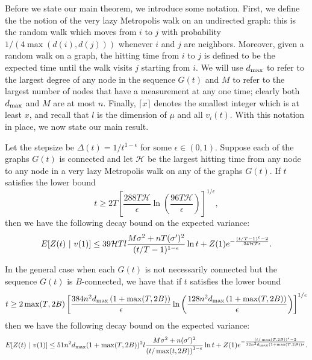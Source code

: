 \documentclass[final]{siamltex}
\begin{document}
Before we state our main theorem, we introduce some notation. First, we define the the notion of the very lazy Metropolis walk on an undirected graph: this is the random walk which moves from $i$ to $j$ with probability 
$1/(4\max(d(i),d(j)))$ whenever $i$ and $j$ are neighbors. Moreover, given a random walk on a graph, the hitting time from $i$ to $j$ is defined to be the expected time until
the walk visits $j$ starting from $i$. We will use $d_{\rm max}$ to refer to the largest degree of any node in the sequence $G(t)$ and $M$ to refer to the
largest number of nodes that have a measurement at any one time; clearly both $d_{\rm max}$ and $M$ are at most $n$. Finally,  $\lceil x \rceil$ denotes the smallest integer which is at least $x$, and recall that $l$ is the dimension of $\mu$ and all $v_i(t)$. With this notation in place, we now state our main result. 

\bigskip

\begin{theorem} \label{mainthm} Let the stepsize be $\Delta(t)=1/t^{1-\epsilon}$ for some $\epsilon \in (0,1)$. Suppose each of the graphs  $G(t)$ is connected and let $\mathcal{H}$ be the largest hitting time from any node to any node in a very lazy
Metropolis walk on any of the graphs $G(t)$. If $t$ satisfies the lower bound
\begin{equation} \label{transient} t \geq 2T \left[ \frac{288T  \mathcal{H} }{\epsilon} \ln \left( \frac{96T   \mathcal{H} }{\epsilon}  \right) \right]^{1/\epsilon}, \end{equation}
 then we have the following decay bound on the expected variance: 
\begin{equation} \label{eq:connected} 
 E[ Z(t) ~|~ v(1) ]  \leq   39 {\cal H} T l \frac{M \sigma^2 + n T(\sigma')^2}{(t/T-1)^{1 -  \epsilon}} \ln t + Z(1) e^{-\frac{(t/T-1)^\epsilon - 2}{24 \mathcal{H} T\epsilon}}.  \end{equation}

In the general case when each $G(t)$ is not necessarily connected but the sequence $G(t)$ is $B$-connected, we have that if $t$ satisfies the lower bound
\[ t \geq 2 \max(T,2B) \left[ \frac{384 n^2 d_{\rm max} \left( 1 + \max(T,2B) \right) }{\epsilon} \ln \left( \frac{128 n^2 d_{\rm max} \left( 1 + \max(T,2B) \right) }{\epsilon} \right) \right]^{1/\epsilon} \] then 
we have the following decay bound on the expected variance: \begin{equation} \label{eq:general} E[ Z(t) ~|~ v(1) ] \leq 51 n^{2} d_{\rm max} ( 1 +  \max(T,2B))^2 l \frac{ M \sigma^2 + n  (\sigma')^2}{\left( t/\max(t,2B) \right)^{1 - \epsilon}} \ln t + Z(1) e^{- \frac{\left(t/\max(T,2B) \right)^\epsilon - 2}{32n^2 d_{\rm max}  \left( 1 + \max(T,2B) \right) \epsilon}}. \end{equation}
\end{theorem} 
\end{document}
